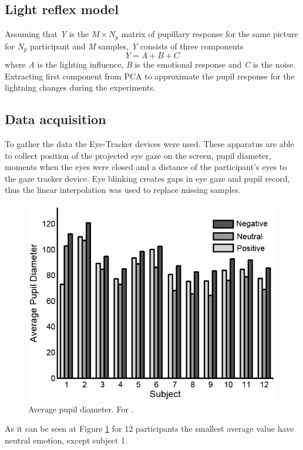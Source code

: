\documentclass[10pt,journal,compsoc,twoside]{IEEEtran}
\newcommand{\Ref}[2]{#2 \ref{#1}}
\begin{document}
\subsection{Light reflex model}
Assuming that \textit{Y} is the $M \times N_{p}$ matrix of pupillary response for the same picture for \textit{$N_{p}$} participant and \textit{M} samples, \textit{Y} consists of three components
\begin{equation}
Y = A + B + C
\end{equation}
where \textit{A} is the lighting influence, \textit{B} is the emotional response and \textit{C} is the noise. Extracting first component from PCA to approximate the pupil response for the lightning changes during the experiments.
\subsection{Data acquisition}
To gather the data the Eye-Tracker devices were used. These apparatus are able to collect position of the projected eye gaze on the screen, pupil diameter, moments when the eyes were closed and a distance of the participant's eyes to the gaze tracker device. Eye blinking creates gaps in eye gaze and pupil record, thus the linear interpolation was used to replace missing samples.
\begin{figure}[ht]
	\centering
	\includegraphics[width=1.0\linewidth]{pupilDiameter1}
	\caption{Average pupil diameter. For \cite{WeiLongBoNanBaoLiang2014}.}
	\label{fig:pupilSize1}
\end{figure}
\newline
As it can be seen at \Ref{fig:pupilSize1}{Figure} for 12 participants the smallest average value have neutral emotion, except subject 1.
\end{document}
